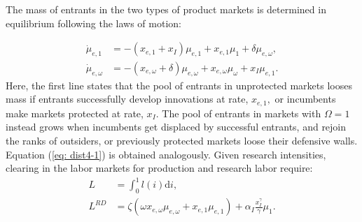 The mass of entrants in the two types of product markets is determined
in equilibrium following the laws of motion:

\begin{align}
\dot{\mu}_{e,1} & =-\left(x_{e,1}+x_{I}\right)\mu_{e,1}+x_{e,1}\mu_{1}+\delta\mu_{e,\omega},\label{eq: dist3-1}\\
\dot{\mu}_{e,\omega} & =-\left(x_{e,\omega}+\delta\right)\mu_{e,\omega}+x_{e,\omega}\mu_{\omega}+x_{I}\mu_{e,1}.\label{eq: dist4-1}
\end{align}
Here, the first line states that the pool of entrants in unprotected
markets looses mass if entrants successfully develop innovations at
rate, $x_{e,1},$ or incumbents make markets protected at rate, $x_{I}.$
The pool of entrants in markets with $\Omega=1$ instead grows when
incumbents get displaced by successful entrants, and rejoin the ranks
of outsiders, or previously protected markets loose their defensive
walls. Equation (\ref{eq: dist4-1}) is obtained analogously. Given
research intensities, clearing in the labor markets for production
and research labor require:
\begin{align}
L & =\int_{0}^{1}l(i)\mathrm{d}i,\label{eq: Lprod}\\
L^{RD} & =\zeta\left(\omega x_{e,\omega}\mu_{e,\omega}+x_{e,1}\mu_{e,1}\right)+\alpha_{I}\frac{x_{I}^{\gamma}}{\gamma}\mu_{1}.\label{eq: LRD}
\end{align}

